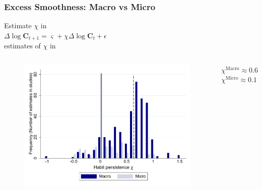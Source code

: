 \documentclass{beamer}\usepackage{dcolumn}
\begin{document}
\begin{frame}
  \frametitle{Excess Smoothness: Macro vs Micro}
Estimate $\chi$ in \\ 
\centering
$ \Delta \log \mathbf{C}_{t+1} = \varsigma + \chi \Delta \log \mathbf{C}_t +\epsilon $\\
 estimates of $\chi$ in \cite*{havranek:metaHabits}
	\begin{columns}
	\centering
\begin{figure}
\begin{center}
\includegraphics[width=.90\textwidth]{../Figures/microMacroMetaHistogram}
\end{center}
\end{figure}
$\chi^{\text{Macro}}\approx 0.6$ \\
\bigskip
$\chi^{\text{Micro}}\approx 0.1$ \\
\end{columns}

\end{frame}
\end{document}
